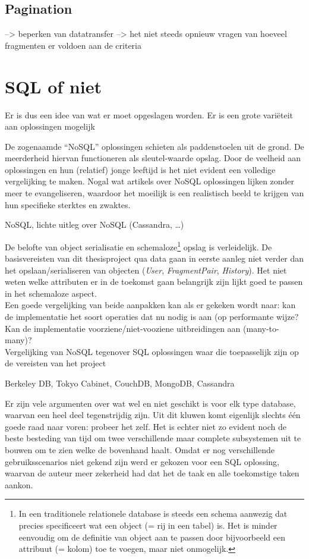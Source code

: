\subsection{Pagination}

--> beperken van datatransfer
--> het niet steeds opnieuw vragen van hoeveel fragmenten er voldoen aan de criteria

\section{SQL of niet}
Er is dus een idee van wat er moet opgeslagen worden. Er is een grote vari\"eteit aan oplossingen mogelijk

De zogenaamde ``NoSQL'' oplossingen schieten als paddenstoelen uit de grond. De meerderheid hiervan functioneren als sleutel-waarde opslag. Door de veelheid aan oplossingen en hun (relatief) jonge leeftijd is het niet evident een volledige vergelijking te maken. Nogal wat artikels over NoSQL oplossingen lijken zonder meer te evangeliseren, waardoor het moeilijk is een realistisch beeld te krijgen van hun specifieke sterktes en zwaktes.

NoSQL, lichte uitleg over NoSQL (Cassandra, \ldots)

De belofte van object serialisatie en schemaloze\footnote{In een traditionele relationele database is steeds een schema aanwezig dat precies specificeert wat een object (= rij in een tabel) is. Het is minder eenvoudig om de definitie van object aan te passen door bijvoorbeeld een attribuut (= kolom) toe te voegen, maar niet onmogelijk.} opslag is verleidelijk. De basisvereisten van dit thesisproject qua data gaan in eerste aanleg niet verder dan het opslaan/serialiseren van objecten (\emph{User}, \emph{FragmentPair}, \emph{History}). Het niet weten welke attributen er in de toekomst gaan belangrijk zijn lijkt goed te passen in het schemaloze aspect.\\

Een goede vergelijking van beide aanpakken kan als er gekeken wordt naar: kan de implementatie het soort operaties dat nu nodig is aan (op performante wijze? Kan de implementatie voorziene/niet-vooziene uitbreidingen aan (many-to-many)?\\


Vergelijking van NoSQL tegenover SQL oplossingen waar die toepasselijk zijn op de vereisten van het project

Berkeley DB, Tokyo Cabinet, CouchDB, MongoDB, Cassandra

Er zijn vele argumenten over wat wel en niet geschikt is voor elk type database, waarvan een heel deel tegenstrijdig zijn. Uit dit kluwen komt eigenlijk slechts \'e\'en goede raad naar voren: probeer het zelf. Het is echter niet zo evident noch de beste besteding van tijd om twee verschillende maar complete subsystemen uit te bouwen om te zien welke de bovenhand haalt. Omdat er nog verschillende gebruiksscenarios niet gekend zijn werd er gekozen voor een SQL oplossing, waarvan de auteur meer zekerheid had dat het de taak en alle toekomstige taken aankon.

